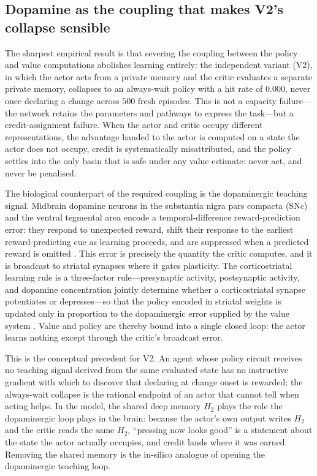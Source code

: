 \subsection{Dopamine as the coupling that makes V2's collapse sensible}

The sharpest empirical result is that severing the coupling between the policy and value computations abolishes learning entirely: the independent variant (V2), in which the actor acts from a private memory and the critic evaluates a separate private memory, collapses to an always-wait policy with a hit rate of $0.000$, never once declaring a change across $500$ fresh episodes. This is not a capacity failure---the network retains the parameters and pathways to express the task---but a credit-assignment failure. When the actor and critic occupy different representations, the advantage handed to the actor is computed on a state the actor does not occupy, credit is systematically misattributed, and the policy settles into the only basin that is safe under any value estimate: never act, and never be penalised.

The biological counterpart of the required coupling is the dopaminergic teaching signal. Midbrain dopamine neurons in the substantia nigra pars compacta (SNc) and the ventral tegmental area encode a temporal-difference reward-prediction error: they respond to unexpected reward, shift their response to the earliest reward-predicting cue as learning proceeds, and are suppressed when a predicted reward is omitted \citep{schultz1997neural,hollerman1998dopamine}. This error is precisely the quantity the critic computes, and it is broadcast to striatal synapses where it gates plasticity. The corticostriatal learning rule is a three-factor rule---presynaptic activity, postsynaptic activity, and dopamine concentration jointly determine whether a corticostriatal synapse potentiates or depresses---so that the policy encoded in striatal weights is updated only in proportion to the dopaminergic error supplied by the value system \citep{morita2014striatal}. Value and policy are thereby bound into a single closed loop: the actor learns nothing except through the critic's broadcast error.

This is the conceptual precedent for V2. An agent whose policy circuit receives no teaching signal derived from the same evaluated state has no instructive gradient with which to discover that declaring at change onset is rewarded; the always-wait collapse is the rational endpoint of an actor that cannot tell when acting helps. In the model, the shared deep memory $H_2$ plays the role the dopaminergic loop plays in the brain: because the actor's own output writes $H_2$ and the critic reads the same $H_2$, ``pressing now looks good'' is a statement about the state the actor actually occupies, and credit lands where it was earned. Removing the shared memory is the in-silico analogue of opening the dopaminergic teaching loop.

